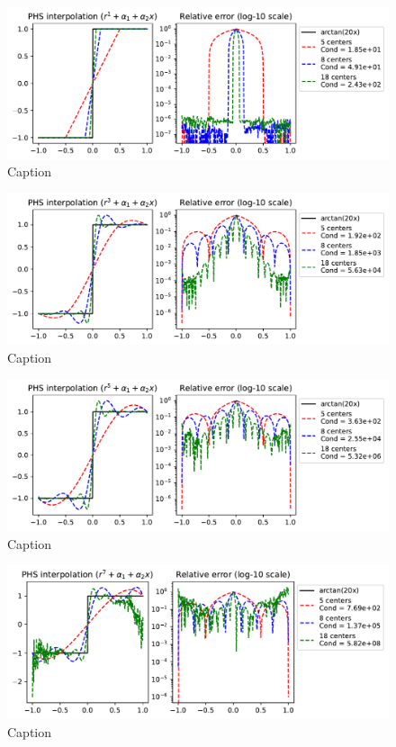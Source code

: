 \documentclass[12pt]{report} %
\begin{document}
\begin{figure}[ht]
  \centering
  \includegraphics[width=\textwidth]{imagenes/phs_interpolation/sign_r1_deg1.pdf}
  \caption{Caption}
  \label{fig:sign-r1-deg1}
\end{figure}

\begin{figure}[ht]
  \centering
  \includegraphics[width=\textwidth]{imagenes/phs_interpolation/sign_r3_deg1.pdf}
  \caption{Caption}
  \label{fig:sign-r3-deg1}
\end{figure}

\begin{figure}[ht]
  \centering
  \includegraphics[width=\textwidth]{imagenes/phs_interpolation/sign_r5_deg1.pdf}
  \caption{Caption}
  \label{fig:sign-r5-deg1}
\end{figure}

\begin{figure}[ht]
  \centering
  \includegraphics[width=\textwidth]{imagenes/phs_interpolation/sign_r7_deg1.pdf}
  \caption{Caption}
  \label{fig:sign-r7-deg1}
\end{figure}
\end{document}
